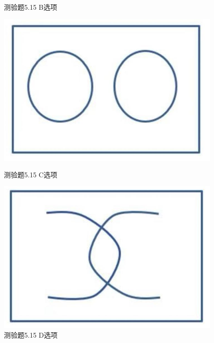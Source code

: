 \documentclass[UTF8, heading=true]{ctexart}
\begin{document}
\begin{figure}[htbp]
\begin{minipage}[t]{0.3\textwidth}
        \caption{测验题5.15 B选项}
\end{minipage}
\end{figure}

\begin{figure}[htbp]
    \centering
    \begin{minipage}[t]{0.3\textwidth}
        \centering
        \includegraphics[width=1\textwidth]{5.15_3.jpg} %
        \caption{测验题5.15 C选项}
    \end{minipage}
	  \hspace{0.1\textwidth} %
    \begin{minipage}[t]{0.3\textwidth}
        \centering
        \includegraphics[width=1\textwidth]{5.15_4.jpg} %
        \caption{测验题5.15 D选项}
\end{minipage}
\end{figure}
\end{document}
